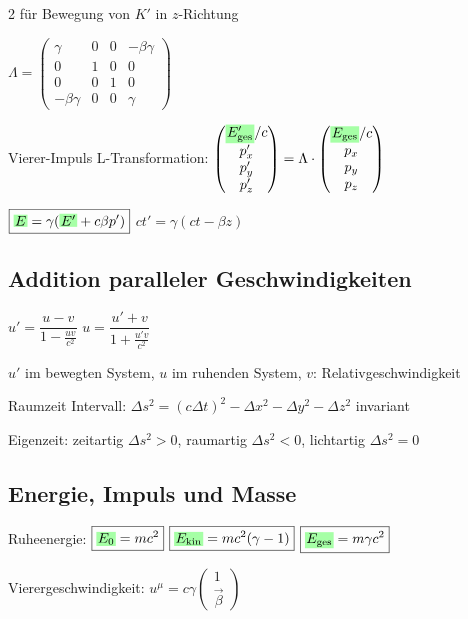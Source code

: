 \documentclass[10pt,a4paper]{article}
\newcommand{\ec}[1]{{\setlength\fboxsep{1pt}\colorbox{green!35}{\ensuremath{#1}}}}
\begin{document}
\begin{multicols}{2}
für Bewegung von $K'$ in $z$-Richtung

$\Lambda=\begin{pmatrix}\gamma&0&0&-\beta\gamma\\0&1&0&0\\0&0&1&0\\-\beta\gamma&0&0&\gamma\end{pmatrix}$

Vierer-Impuls L-Transformation:
$\begin{pmatrix}\ec{E'_{\text{ges}}}/c\\p'_x\\p'_y\\p'_z\end{pmatrix}=\Lambda\cdot\begin{pmatrix}\ec{E_{\text{ges}}}/c\\p_x\\p_y\\p_z\end{pmatrix}$

$\boxed{\ec{E}=\gamma(\ec{E'}+c\beta p')}$ \quad $\boxed{ct'=\gamma(ct-\beta z)}$

\subsection{Addition paralleler Geschwindigkeiten}

$\boxed{u'=\dfrac{u-v}{1-\frac{uv}{c^2}}}$ \quad $\boxed{u=\dfrac{u'+v}{1+\frac{u'v}{c^2}}}$

$u'$ im bewegten System, $u$ im ruhenden System, $v$: Relativgeschwindigkeit

Raumzeit Intervall: $\boxed{\Delta s^2=(c\Delta t)^2-\Delta x^2-\Delta y^2-\Delta z^2}$ invariant

Eigenzeit: zeitartig $\Delta s^2>0$, raumartig $\Delta s^2<0$, lichtartig $\Delta s^2=0$

\subsection{Energie, Impuls und Masse}

Ruheenergie: $\boxed{\ec{E_0}=mc^2}$ \quad $\boxed{\ec{E_{\text{kin}}}=mc^2(\gamma-1)}$ \quad $\boxed{\ec{E_{\text{ges}}}=m\gamma c^2}$

Vierergeschwindigkeit: $u^\mu=c\gamma\begin{pmatrix}1\\\vec{\beta}\end{pmatrix}$


\end{multicols}
\end{document}

